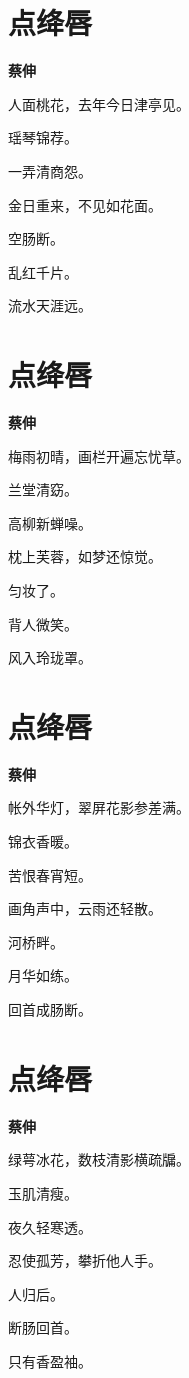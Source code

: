 \documentclass[12pt,a4paper]{ctexbook}
\begin{document}
\section{点绛唇}
\textbf{蔡伸}\par\vspace{0.5em}
人面桃花，去年今日津亭见。\par
瑶琴锦荐。\par
一弄清商怨。\par
金日重来，不见如花面。\par
空肠断。\par
乱红千片。\par
流水天涯远。\par

\section{点绛唇}
\textbf{蔡伸}\par\vspace{0.5em}
梅雨初晴，画栏开遍忘忧草。\par
兰堂清窈。\par
高柳新蝉噪。\par
枕上芙蓉，如梦还惊觉。\par
匀妆了。\par
背人微笑。\par
风入玲珑罩。\par

\section{点绛唇}
\textbf{蔡伸}\par\vspace{0.5em}
帐外华灯，翠屏花影参差满。\par
锦衣香暖。\par
苦恨春宵短。\par
画角声中，云雨还轻散。\par
河桥畔。\par
月华如练。\par
回首成肠断。\par

\section{点绛唇}
\textbf{蔡伸}\par\vspace{0.5em}
绿萼冰花，数枝清影横疏牖。\par
玉肌清瘦。\par
夜久轻寒透。\par
忍使孤芳，攀折他人手。\par
人归后。\par
断肠回首。\par
只有香盈袖。\par
\end{document}
